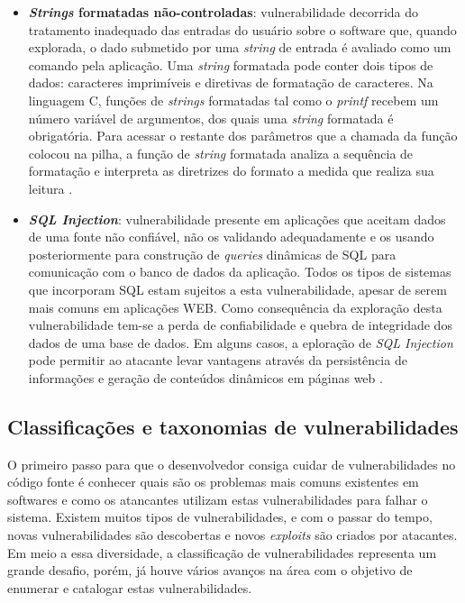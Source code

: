 \begin{itemize}
\item \textbf{\emph{Strings} formatadas não-controladas}: vulnerabilidade decorrida do tratamento inadequado das entradas do usuário sobre o software que, quando explorada, o dado submetido por uma \emph{string} de entrada é avaliado como um comando pela aplicação. Uma \emph{string} formatada pode conter dois tipos de dados: caracteres imprimíveis e diretivas de formatação de caracteres. Na linguagem C, funções de \emph{strings} formatadas tal como o \emph{printf} recebem um número variável de argumentos, dos quais uma \emph{string}  formatada é obrigatória. Para acessar o restante dos parâmetros que a chamada da função colocou na pilha, a função de \emph{string} formatada analiza a sequência de formatação e interpreta as diretrizes do formato a medida que realiza sua leitura \cite{lhee2002}.

\item \textbf{\emph{SQL Injection}}: vulnerabilidade presente em aplicações que aceitam dados de uma fonte não confiável, não os validando adequadamente e os usando posteriormente para construção de \emph{queries} dinâmicas de SQL para comunicação com o banco de dados da aplicação. Todos os tipos de sistemas que incorporam SQL estam sujeitos a esta vulnerabilidade, apesar de serem mais comuns em aplicações WEB. Como consequência da exploração desta vulnerabilidade tem-se a perda de confiabilidade e quebra de integridade dos dados de uma base de dados. Em alguns casos, a eploração de \emph{SQL Injection} pode permitir ao atacante levar vantagens através da persistência de informações e geração de conteúdos dinâmicos em páginas web \cite{uscert2012}.
\end{itemize}


\subsection{Classificações e taxonomias de vulnerabilidades}
\label{subsec-vulnerabilities-taxonomy}
%

O primeiro passo para que o desenvolvedor consiga cuidar de vulnerabilidades no código fonte é conhecer quais são os problemas mais comuns existentes em softwares e como os atancantes utilizam estas vulnerabilidades para falhar o sistema. Existem muitos tipos de vulnerabilidades, e com o passar do tempo, novas vulnerabilidades são descobertas e novos \emph{exploits} são criados por atacantes. Em meio a essa diversidade, a classificação de vulnerabilidades representa um grande desafio, porém, já houve vários avanços na área com o objetivo de enumerar e catalogar estas vulnerabilidades.

